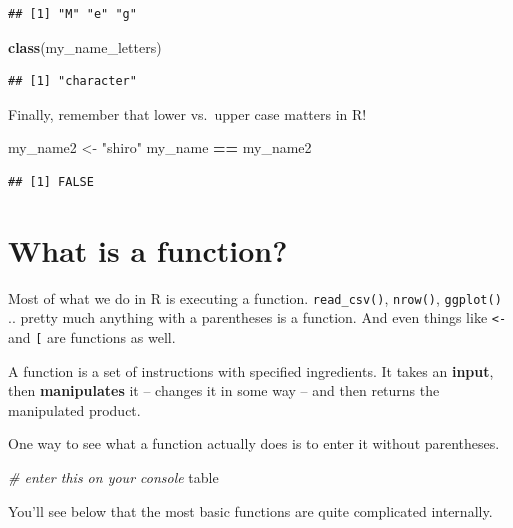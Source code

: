 \documentclass[
]{book}
\newenvironment{Shaded}{\begin{snugshade}}{\end{snugshade}}
\newcommand{\CommentTok}[1]{\textcolor[rgb]{0.56,0.35,0.01}{\textit{#1}}}
\newcommand{\KeywordTok}[1]{\textcolor[rgb]{0.13,0.29,0.53}{\textbf{#1}}}
\newcommand{\NormalTok}[1]{#1}
\newcommand{\OperatorTok}[1]{\textcolor[rgb]{0.81,0.36,0.00}{\textbf{#1}}}
\newcommand{\StringTok}[1]{\textcolor[rgb]{0.31,0.60,0.02}{#1}}
\theoremstyle{definition}
\theoremstyle{definition}
\theoremstyle{definition}
\theoremstyle{remark}
\begin{document}
\begin{verbatim}
## [1] "M" "e" "g"
\end{verbatim}

\begin{Shaded}
\begin{Highlighting}[]
\KeywordTok{class}\NormalTok{(my\_name\_letters)}
\end{Highlighting}
\end{Shaded}

\begin{verbatim}
## [1] "character"
\end{verbatim}

Finally, remember that lower vs.~upper case matters in R!

\begin{Shaded}
\begin{Highlighting}[]
\NormalTok{my\_name2 <{-}}\StringTok{ "shiro"}
\NormalTok{my\_name }\OperatorTok{==}\StringTok{ }\NormalTok{my\_name2}
\end{Highlighting}
\end{Shaded}

\begin{verbatim}
## [1] FALSE
\end{verbatim}

\hypertarget{what-is-a-function}{%
\section{What is a function?}\label{what-is-a-function}}

Most of what we do in R is executing a function. \texttt{read\_csv()}, \texttt{nrow()}, \texttt{ggplot()} .. pretty much anything with a parentheses is a function. And even things like \texttt{\textless{}-} and \texttt{{[}} are functions as well.

A function is a set of instructions with specified ingredients. It takes an \textbf{input}, then \textbf{manipulates} it -- changes it in some way -- and then returns the manipulated product.

One way to see what a function actually does is to enter it without parentheses.

\begin{Shaded}
\begin{Highlighting}[]
\CommentTok{\# enter this on your console}
\NormalTok{table}
\end{Highlighting}
\end{Shaded}

You'll see below that the most basic functions are quite complicated internally.
\end{document}
